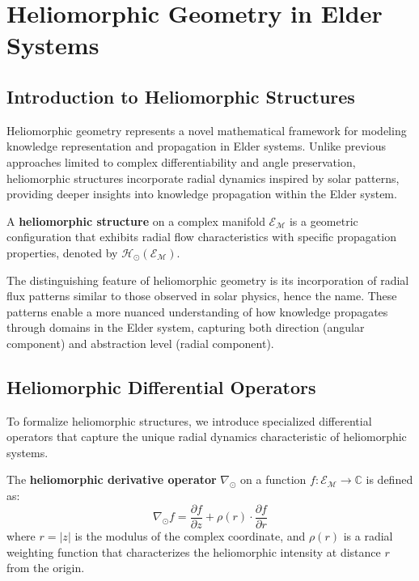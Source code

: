 \chapter{Heliomorphic Geometry in Elder Systems}

\section{Introduction to Heliomorphic Structures}

Heliomorphic geometry represents a novel mathematical framework for modeling knowledge representation and propagation in Elder systems. Unlike previous approaches limited to complex differentiability and angle preservation, heliomorphic structures incorporate radial dynamics inspired by solar patterns, providing deeper insights into knowledge propagation within the Elder system.

\begin{definition}
A \textbf{heliomorphic structure} on a complex manifold $\mathcal{E}_{\mathcal{M}}$ is a geometric configuration that exhibits radial flow characteristics with specific propagation properties, denoted by $\mathcal{H}_{\odot}(\mathcal{E}_{\mathcal{M}})$.
\end{definition}

The distinguishing feature of heliomorphic geometry is its incorporation of radial flux patterns similar to those observed in solar physics, hence the name. These patterns enable a more nuanced understanding of how knowledge propagates through domains in the Elder system, capturing both direction (angular component) and abstraction level (radial component).

\section{Heliomorphic Differential Operators}

To formalize heliomorphic structures, we introduce specialized differential operators that capture the unique radial dynamics characteristic of heliomorphic systems.

\begin{definition}
The \textbf{heliomorphic derivative operator} $\nabla_{\odot}$ on a function $f: \mathcal{E}_{\mathcal{M}} \rightarrow \mathbb{C}$ is defined as:
\begin{equation}
\nabla_{\odot} f = \frac{\partial f}{\partial z} + \rho(r) \cdot \frac{\partial f}{\partial r}
\end{equation}
where $r = |z|$ is the modulus of the complex coordinate, and $\rho(r)$ is a radial weighting function that characterizes the heliomorphic intensity at distance $r$ from the origin.
\end{definition}

